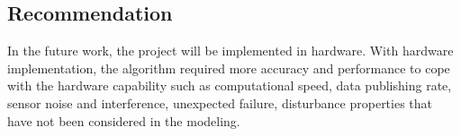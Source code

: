 
%


\subsection{Recommendation}
\hspace{1.27cm}
In the future work, the project will be implemented in hardware. With hardware implementation, the algorithm required more accuracy and performance to cope with the hardware capability such as computational speed, data publishing rate, sensor noise and interference, unexpected failure, disturbance properties that have not been considered in the modeling. \par